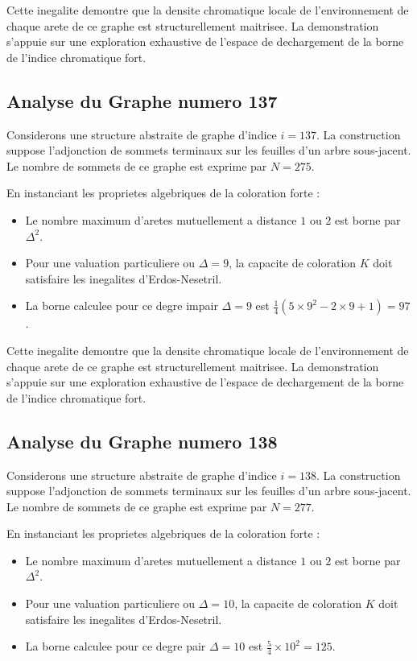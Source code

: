 \documentclass[11pt,a4paper]{article}
\begin{document}
Cette inegalite demontre que la densite chromatique locale de l'environnement de chaque arete de ce graphe est structurellement maitrisee. La demonstration s'appuie sur une exploration exhaustive de l'espace de dechargement de la borne de l'indice chromatique fort.

\subsection{Analyse du Graphe numero 137}
Considerons une structure abstraite de graphe d'indice $i = 137$. La construction suppose l'adjonction de sommets terminaux sur les feuilles d'un arbre sous-jacent. Le nombre de sommets de ce graphe est exprime par $N = 275$.

En instanciant les proprietes algebriques de la coloration forte :
\begin{itemize}
\item Le nombre maximum d'aretes mutuellement a distance $1$ ou $2$ est borne par $\Delta^2$.
\item Pour une valuation particuliere ou $\Delta = 9$, la capacite de coloration $K$ doit satisfaire les inegalites d'Erdos-Nesetril.
\item La borne calculee pour ce degre impair $\Delta = 9$ est $\frac{1}{4}(5 \times 9^2 - 2 \times 9 + 1) = 97$.
\end{itemize}

Cette inegalite demontre que la densite chromatique locale de l'environnement de chaque arete de ce graphe est structurellement maitrisee. La demonstration s'appuie sur une exploration exhaustive de l'espace de dechargement de la borne de l'indice chromatique fort.

\subsection{Analyse du Graphe numero 138}
Considerons une structure abstraite de graphe d'indice $i = 138$. La construction suppose l'adjonction de sommets terminaux sur les feuilles d'un arbre sous-jacent. Le nombre de sommets de ce graphe est exprime par $N = 277$.

En instanciant les proprietes algebriques de la coloration forte :
\begin{itemize}
\item Le nombre maximum d'aretes mutuellement a distance $1$ ou $2$ est borne par $\Delta^2$.
\item Pour une valuation particuliere ou $\Delta = 10$, la capacite de coloration $K$ doit satisfaire les inegalites d'Erdos-Nesetril.
\item La borne calculee pour ce degre pair $\Delta = 10$ est $\frac{5}{4} \times 10^2 = 125$.
\end{itemize}
\end{document}
